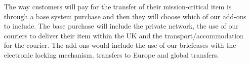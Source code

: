 The way customers will pay for the transfer of their mission-critical item is through a base system purchase and then they will choose which of our add-ons to include. The base purchase will include the private network, the use of our couriers to deliver their item within the UK and the transport/accommodation for the courier. The add-ons would include the use of our briefcases with the electronic locking mechanism, transfers to Europe and global transfers. 
